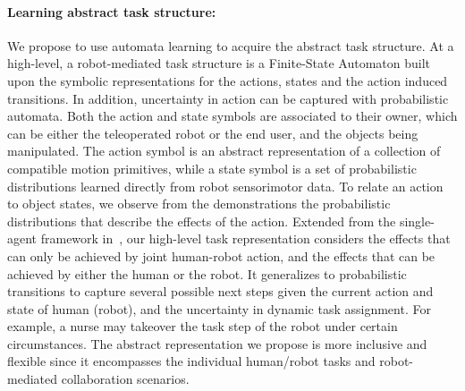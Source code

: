 \documentclass[letterpaper, 11 pt, onecolumn]{article}
\begin{document}
 \paragraph*{Learning abstract task structure:} We propose to use automata learning to acquire the abstract task structure. At a high-level, a robot-mediated task structure is a Finite-State Automaton built upon the symbolic representations for the actions, states and the action induced transitions. In addition, uncertainty in action can be captured with probabilistic automata. 
Both the action and state symbols are associated to their owner, which can be either the teleoperated robot or the end user, and the objects being manipulated. The action symbol is an abstract representation of a collection of compatible motion primitives, while a state symbol is a set of probabilistic distributions learned directly from robot sensorimotor data. To relate an action to object states, we observe from the demonstrations the probabilistic distributions that describe the effects of the action. Extended from the single-agent framework in~\cite{konidaris2018skills}, our high-level task representation considers the effects that can only be achieved by joint human-robot action, and the effects that can be achieved by either the human or the robot. It generalizes to probabilistic transitions to capture several possible next steps given the current action and state of human (robot), and the uncertainty in dynamic task assignment. For example, a nurse may takeover the task step of the robot under certain circumstances. The abstract representation we propose is more inclusive and flexible since it encompasses the individual human/robot tasks and robot-mediated collaboration scenarios. 
\end{document}
